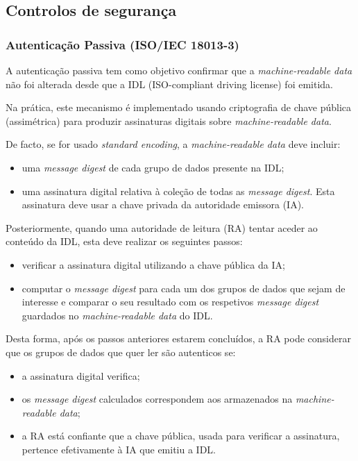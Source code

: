 

\subsection{Controlos de segurança}
\label{sec:orgbc0a271}
\subsubsection{Autenticação Passiva (ISO/IEC 18013-3)}
\label{sec:org479f770}
A autenticação passiva tem como objetivo confirmar que a \emph{machine-readable
data} não foi alterada desde que a IDL (ISO-compliant driving license) foi
emitida.

Na prática, este mecanismo é implementado usando criptografia de chave
pública (assimétrica) para produzir assinaturas digitais sobre
\emph{machine-readable data}.

De facto, se for usado \emph{standard encoding}, a \emph{machine-readable data} deve incluir:
\begin{itemize}
\item uma \emph{message digest} de cada grupo de dados presente na IDL;
\item uma assinatura digital relativa à coleção de todas as \emph{message digest}. Esta
assinatura deve usar a chave privada da autoridade emissora (IA).
\end{itemize}

Posteriormente, quando uma autoridade de leitura (RA) tentar aceder ao
conteúdo da IDL, esta deve realizar os seguintes passos:
\begin{itemize}
\item verificar a assinatura digital utilizando a chave pública da IA;
\item computar o \emph{message digest} para cada um dos grupos de dados que sejam de
interesse e comparar o seu resultado com os respetivos \emph{message digest}
guardados no \emph{machine-readable data} do IDL.
\end{itemize}

Desta forma, após os passos anteriores estarem concluídos, a RA pode
considerar que os grupos de dados que quer ler são autenticos se:
\begin{itemize}
\item a assinatura digital verifica;
\item os \emph{message digest} calculados correspondem aos armazenados na
\emph{machine-readable data};
\item a RA está confiante que a chave pública, usada para verificar a
assinatura, pertence efetivamente à IA que emitiu a IDL.
\end{itemize}


